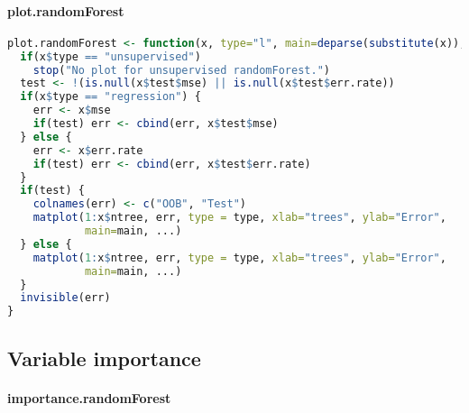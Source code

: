 \documentclass[10pt,a4paper]{article}
\begin{document}
\paragraph{plot.randomForest}
\begin{lstlisting}[language=R]
plot.randomForest <- function(x, type="l", main=deparse(substitute(x)), ...) {
  if(x$type == "unsupervised")
    stop("No plot for unsupervised randomForest.")
  test <- !(is.null(x$test$mse) || is.null(x$test$err.rate))
  if(x$type == "regression") {
    err <- x$mse
    if(test) err <- cbind(err, x$test$mse)
  } else {
    err <- x$err.rate
    if(test) err <- cbind(err, x$test$err.rate)
  }
  if(test) {
    colnames(err) <- c("OOB", "Test")
    matplot(1:x$ntree, err, type = type, xlab="trees", ylab="Error",
            main=main, ...)
  } else {
    matplot(1:x$ntree, err, type = type, xlab="trees", ylab="Error",
            main=main, ...)
  }
  invisible(err)
}
\end{lstlisting}
\subsection{Variable importance}
\bigskip
\paragraph*{importance.randomForest}
\end{document}
